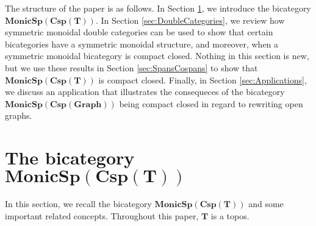 \documentclass{tac}
\newcommand{\cat}[1]{\mathbf{#1}}
\newcommand{\bimonspcsp}[1]{\mathbf{MonicSp(Csp(#1))}}
\theoremstyle{remark}
\theoremstyle{definition}
\begin{document}
The structure of the paper is as follows.  
In Section 
	\ref{sec:Span cospan bicats}, 
we introduce the bicategory $\bimonspcsp{T}$.  
In Section 
	\ref{sec:DoubleCategories}, 
we review how symmetric monoidal double categories can be used 
to show that certain bicategories have a symmetric monoidal structure,
and moreover, when a symmetric monoidal bicategory is compact closed.  
Nothing in this section is new, 
but we use these results 
in Section \ref{sec:SpansCospans} 
to show that $\bimonspcsp{T}$ is compact closed.
Finally, in Section 
	\ref{sec:Applications}, 
we discuss an application that illustrates the consequeces of the bicategory $\mathbf{MonicSp(Csp(Graph))}$ being compact closed
in regard to rewriting open graphs.



\section{The bicategory \texorpdfstring{$\mathbf{MonicSp(Csp(T))}$}{}} %
\label{sec:Span cospan bicats}

In this section, we recall the bicategory $\bimonspcsp{T}$ and some important related concepts.  
Throughout this paper, 
$\cat{T}$ is a topos.
\end{document}
